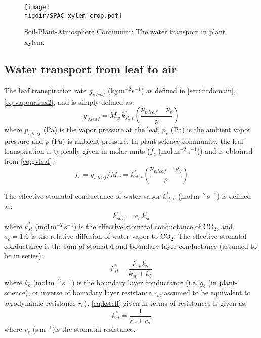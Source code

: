 \begin{figure}[t]
	\centering
	\texttt{[image: \\figdir/SPAC\_xylem-crop.pdf]}
	\caption{Soil-Plant-Atmosphere Continuum: The water transport in plant xylem.}
	\label{fig:SPAC_xylem}
\end{figure}


\subsection{Water transport from leaf to air}

The leaf transpiration rate $g_{\textit{v,leaf}}$ (kg\,m$^{-2}$s$^{-1}$) as defined in \cref{sec:airdomain}, \cref{eq:vapourflux2}, and is simply defined as:
\begin{equation}
g_{\textit{v,leaf}} = M_w\, k_{st,v}^* \left(\frac{p_{\textit{v,leaf}} - p_v}{p}\right)
\label{eq:gvleaf}
\end{equation}
where $p_{\textit{v,leaf}}$ (Pa) is the vapor pressure at the leaf, $p_v$ (Pa) is the ambient vapor pressure and $p$ (Pa) is ambient pressure. In plant-science community, the leaf transpiration is typically given in molar units ($f_c$ (mol\,m$^{-2}$\,s$^{-1}$)) and is obtained from \cref{eq:gvleaf}:
\begin{equation}
f_v = g_{\textit{v,leaf}} / M_w = k_{st,v}^* \left(\frac{p_{\textit{v,leaf}} - p_v}{p}\right)
\label{eq:fvorig}
\end{equation}

The effective stomatal conductance of water vapor $k_{st,v}^*$ (mol\,m$^{-2}$\,s$^{-1}$) is defined as:
\begin{equation}
k_{\textit{st,v}}^* = a_c \,k_{\textit{st}}^*
\end{equation}
where $k_{\textit{st}}^*$ (mol\,m$^{-2}$\,s$^{-1}$) is the effective stomatal conductance of CO$_2$, and $a_c = 1.6$ is the relative diffusion of water vapor to CO$_2$. The effective stomatal conductance is the sum of stomatal and boundary layer conductance (assumed to be in series):
\begin{equation}
k_{\textit{st}}^* = \frac{k_{\textit{st}}\,k_b}{k_{\textit{st}} + k_b}
\label{eq:ksteff}
\end{equation}
where $k_b$ (mol\,m$^{-2}$\,s$^{-1}$) is the boundary layer conductance (i.e. $g_b$ (in plant-science), or inverse of boundary layer resistance $r_b$, assumed to be equivalent to aerodynamic resistance $r_a$). \cref{eq:ksteff} given in terms of resistances is given as:
\begin{equation}
k_{\textit{st}}^* = \frac{1}{r_s + r_a}
\label{eq:hcm2}
\end{equation}
where $r_s$ (s\,m$^{-1}$)is the stomatal resistance.


